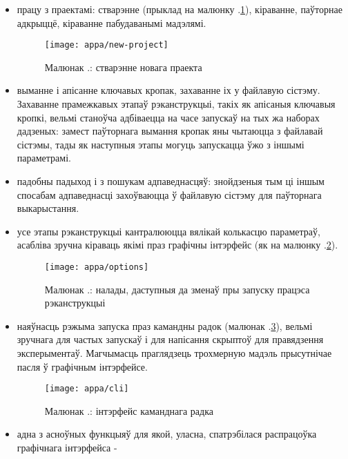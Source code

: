 \begin{itemize}
    \item працу з праектамі: стварэнне (прыклад на малюнку \cursection.\ref{fig:appa-new-project}),
    кіраванне, паўторнае адкрыццё, кіраванне пабудаванымі мадэлямі.
    \begin{figure}[H]
      \centering
      \texttt{[image: appa/new-project]}
      \captionsetup{labelformat=empty}
      \caption{Малюнак \cursection.: стварэнне новага праекта}
      \label{fig:appa-new-project}
    \end{figure}
    \item выманне і апісанне ключавых кропак, захаванне іх у файлавую сістэму. Захаванне
    прамежкавых этапаў рэканструкцыі, такіх як апісаныя ключавыя кропкі, вельмі станоўча
    адбіваецца на часе запускаў на тых жа наборах дадзеных: замест паўторнага вымання кропак
    яны чытаюцца з файлавай сістэмы, тады як наступныя этапы могуць запускацца ўжо з іншымі параметрамі.
    \item падобны падыход і з пошукам адпаведнасцяў: знойдзеныя тым ці іншым спосабам адпаведнасці
    захоўваюцца ў файлавую сістэму для паўторнага выкарыстання.
    \item усе этапы рэканструкцыі кантралююцца вялікай колькасцю параметраў, асабліва
    зручна кіраваць якімі праз графічны інтэрфейс (як на малюнку \cursection.\ref{fig:appa-options}).
    \begin{figure}[H]
      \centering
      \texttt{[image: appa/options]}
      \captionsetup{labelformat=empty}
      \caption{Малюнак \cursection.: налады, даступныя да зменаў пры запуску працэса рэканструкцыі}
      \label{fig:appa-options}
    \end{figure}
    \item наяўнасць рэжыма запуска праз камандны радок (малюнак \cursection.\ref{fig:appa-cli}),
    вельмі зручнага для частых запускаў і для напісання скрыптоў для правядзення эксперыментаў.
    Магчымасць праглядзець трохмерную мадэль прысутнічае пасля ў графічным інтэрфейсе.
    \begin{figure}[H]
      \centering
      \texttt{[image: appa/cli]}
      \captionsetup{labelformat=empty}
      \caption{Малюнак \cursection.: інтэрфейс каманднага радка}
      \label{fig:appa-cli}
    \end{figure}
    \item адна з асноўных функцыяў для якой, уласна, спатрэбілася распрацоўка графічнага інтэрфейса -

\end{itemize}
